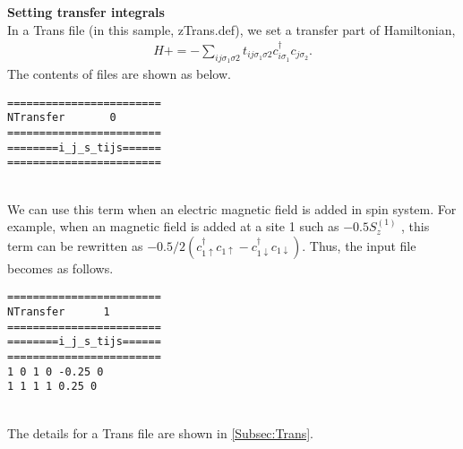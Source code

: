 \begin{description}
\item {\bf Setting transfer integrals}\\
In a Trans file (in this sample, zTrans.def), we set a transfer part of Hamiltonian,
\begin{align}
H +=-\sum_{ij\sigma_1\sigma2} t_{ij\sigma_1\sigma2}c_{i\sigma_1}^{\dag}c_{j\sigma_2}.
\end{align}
The contents of files are shown as below.\\
\begin{minipage}{15cm}
\begin{screen}
\begin{verbatim}
======================== 
NTransfer       0  
======================== 
========i_j_s_tijs====== 
======================== 
\end{verbatim}
\end{screen}
\end{minipage}
~\\
We can use this term when an electric magnetic field is added in spin system. For example, when an magnetic field is added at a site 1 such as $-0.5 S_z^{(1)}$ , this term can be rewritten as $-0.5/2(c_{1\uparrow}^{\dag}c_{1\uparrow}-c_{1\downarrow}^{\dag}c_{1\downarrow})$. Thus, the input file becomes as follows.\\
\begin{minipage}{15cm}
\begin{screen}
\begin{verbatim}
======================== 
NTransfer      1   
======================== 
========i_j_s_tijs====== 
======================== 
1 0 1 0 -0.25 0
1 1 1 1 0.25 0
\end{verbatim}
\end{screen}
\end{minipage}
~\\
The details for a Trans file are shown in \ref{Subsec:Trans}.


\end{description}
